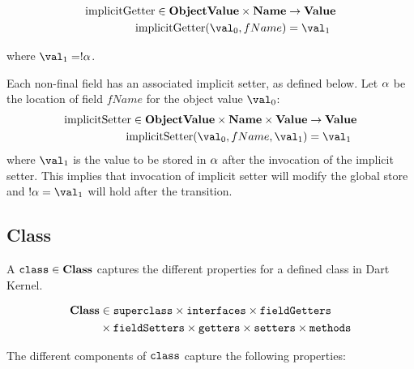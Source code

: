 \documentclass[a4paper,oneside]{article}
\DeclareMathOperator{\getter}{implicitGetter}
\DeclareMathOperator{\setter}{implicitSetter}
\begin{document}
\begin{align*}
  \getter \in \dobjval \times \mathbf{Name} &\rightarrow \dval\\
  \getter(\val_0, fName) &= \val_1
\end{align*}

\noindent where $\val_1 = \deref{\loc}$.

Each non-final field has an associated implicit setter, as defined below.
Let $\alpha$ be the location of field $fName$ for the object value $\val_0$:
\begin{align*}
  \setter \in \dobjval \times \mathbf{Name} \times \dval &\rightarrow \dval\\
  \setter(\val_0, fName, \val_1) &= \val_1
\end{align*}
where $\val_1$ is the value to be stored in $\alpha$ after the invocation of the implicit setter.
This implies that invocation of implicit setter will modify the global store and  $\deref{\loc} = \val_1$ will hold after the transition.


\subsection{Class}
\label{subsec:class}

A $\tt{class} \in \mathbf{Class}$ captures the different properties for a defined class in Dart Kernel.

\begin{align}
\notag
\mathbf{Class} &\in \tt{superclass} \times \tt{interfaces} \times \tt{fieldGetters}\\\notag
&\times \tt{fieldSetters} \times \tt{getters} \times \tt{setters} \times \tt{methods}
\end{align}

The different components of $\tt{class}$ capture the following properties:
\end{document}
